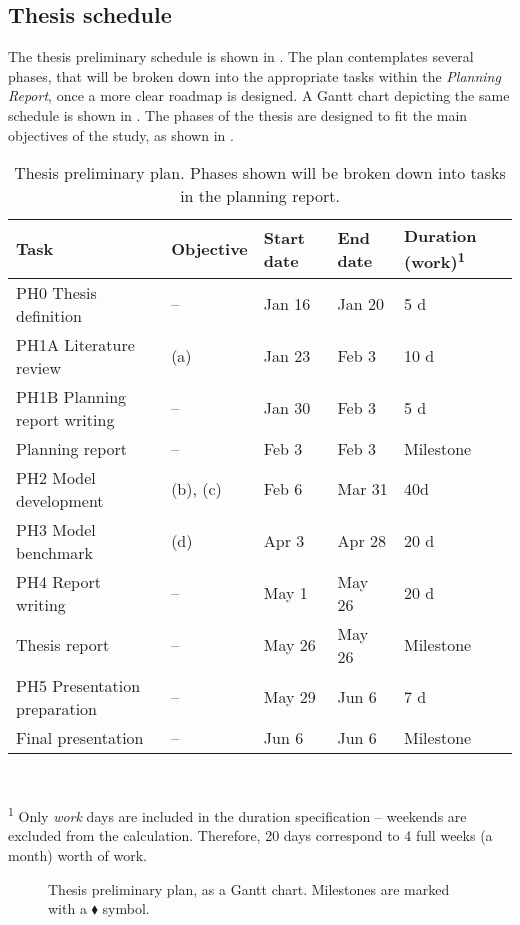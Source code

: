 \begin{multicols}{2}
\section{Thesis schedule}
\label{s:schedule}
The thesis preliminary schedule is shown in . The plan contemplates several phases, that will be broken down into the appropriate tasks within the \textit{Planning Report}, once a more clear roadmap is designed. A Gantt chart depicting the same schedule is shown in . The phases of the thesis are designed to fit the main objectives of the study, as shown in .

\printbibliography
\end{multicols}

\begin{table}[h!]
\centering
\footnotesize
\caption{Thesis preliminary plan. Phases shown will be broken down into tasks in the planning report.}
\label{t:schedule}
\begin{tabular}{lllll}
\toprule
Task & Objective & Start date & End date & Duration (work)\textsuperscript{1} \\
\midrule
PH0 Thesis definition & -- & Jan 16 & Jan 20 & 5 d \\
PH1A Literature review & (a) & Jan 23 & Feb 3 & 10 d \\
PH1B Planning report writing & -- & Jan 30 & Feb 3 & 5 d \\
Planning report & -- & Feb 3 & Feb 3 & Milestone \\
PH2 Model development & (b), (c) & Feb 6 & Mar 31 & 40d \\
PH3 Model benchmark & (d) & Apr 3 & Apr 28 & 20 d \\
PH4 Report writing & -- & May 1 & May 26 & 20 d \\
Thesis report & -- & May 26 & May 26 & Milestone \\
PH5 Presentation preparation & -- & May 29 & Jun 6 & 7 d \\
Final presentation & -- & Jun 6 & Jun 6 & Milestone \\
\bottomrule
\end{tabular}
{\\ \scriptsize \parbox{0.7\linewidth}{\textsuperscript{1} Only \textit{work} days are included in the duration specification -- weekends are excluded from the calculation. Therefore, 20 days correspond to 4 full weeks (a month) worth of work.}}
\end{table}

\begin{figure}[h!]
\centering
\footnotesize
{\setlength{\fboxsep}{0pt}}
\caption{Thesis preliminary plan, as a Gantt chart. Milestones are marked with a $\blacklozenge$ symbol.}
\label{f:gantt-chart}
\end{figure}